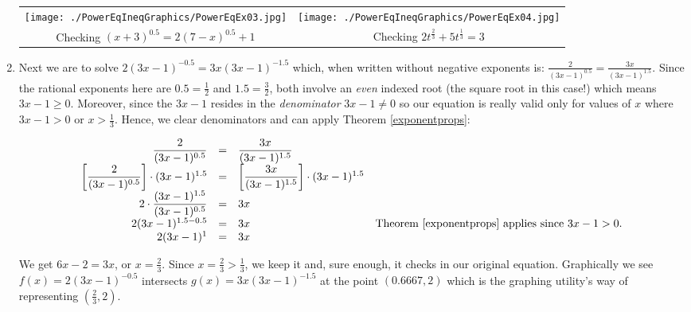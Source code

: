 \documentclass{ximera}
\begin{document}
\begin{example}
\begin{enumerate}
\begin{center}

\begin{tabular}{cc}

\texttt{[image: ./PowerEqIneqGraphics/PowerEqEx03.jpg]} & \texttt{[image: ./PowerEqIneqGraphics/PowerEqEx04.jpg]} \\

Checking $(x+3)^{0.5} = 2(7-x)^{0.5}+1$ & Checking  $2t^{\frac{2}{3}} + 5t^{\frac{1}{3}} = 3$ \\

\end{tabular}

\end{center} 


\item Next we are to solve $2(3x-1)^{-0.5}  = 3x (3x-1)^{-1.5}$ which, when written without negative exponents is: $\frac{2}{(3x-1)^{0.5}} = \frac{3x}{(3x-1)^{1.5}}$.  Since the rational exponents here are $0.5 = \frac{1}{2}$ and $1.5 = \frac{3}{2}$, both involve an \textit{even} indexed root (the square root in this case!) which means $3x-1 \geq 0$.  Moreover, since the $3x-1$ resides in the \textit{denominator} $3x - 1 \neq 0$ so our equation is really valid only for values of $x$ where $3x-1>0$ or $x > \frac{1}{3}$.  Hence, we clear denominators and can apply Theorem \ref{exponentprops}:

\[ \begin{array}{rclr}

\dfrac{2}{(3x-1)^{0.5}} & = & \dfrac{3x}{(3x-1)^{1.5}} & \\

\left[ \dfrac{2}{(3x-1)^{0.5}} \right] \cdot (3x-1)^{1.5} & = & \left[  \dfrac{3x}{(3x-1)^{1.5}} \right ] \cdot (3x-1)^{1.5} & \\

2 \cdot \dfrac{(3x-1)^{1.5}}{(3x-1)^{0.5}} & = & 3x & \\

2 (3x-1)^{1.5-0.5} & = & 3x & \text{Theorem \ref{exponentprops} applies since $3x-1 > 0$.} \\

2 (3x-1)^{1} & = & 3x & \\  \end{array} \]

We get $6x-2 = 3x$, or $x = \frac{2}{3}$.  Since $x = \frac{2}{3} > \frac{1}{3}$, we keep it and, sure enough, it  checks in our original equation. Graphically we see $f(x)=2(3x-1)^{-0.5}$ intersects $g(x) = 3x (3x-1)^{-1.5}$ at the point $(0.6667, 2)$ which is the graphing utility's way of representing $\left(\frac{2}{3}, 2\right)$.


\end{enumerate}
\end{example}
\end{document}
